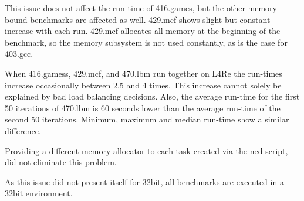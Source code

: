 This issue does not affect the run-time of 416.games, but the other memory-bound
benchmarks are affected as well.
429.mcf shows slight but constant increase with each run.
429.mcf allocates all memory at the beginning of the benchmark, so the memory
subsystem is not used constantly, as is the case for 403.gcc.

When 416.gamess, 429.mcf, and 470.lbm run together on L4Re the run-times
increase occasionally between 2.5 and 4 times.
This increase cannot solely be explained by bad load balancing decisions.
Also, the average run-time for the first 50 iterations of 470.lbm is 60 seconds
lower than the average run-time of the second 50 iterations.
Minimum, maximum and median run-time show a similar difference.

Providing a different memory allocator to each task created via the ned script,
did not eliminate this problem.

As this issue did not present itself for 32bit, all benchmarks are executed
in a 32bit environment.


\begin{comment}
\paragraph{Benchmarks.}
SPEC progs:
solo runs: SLD, STB, MIPC, CFS
group runs: SLD, STB, MIPC, CFS
--> degradation of median compared  to solo runs

Group runs for different SMT algos: RR, load,
Group runs for different MIPC assignments: load, mpc-ipc

pingpong  clsvr group;
openmp-mmul distribution group; -- load generated by other mmul or fractal



\paragraph{Group Configuration Benchmarks}
The first is a simple \gls{ipc} ping-pong, where the server answers a call from
the client with the number of the core it is currently running on.
The client measures the time for the \gls{ipc} call and prints the answer of
the server together with its own core number and the \gls{ipc} duration.

\end{comment}
